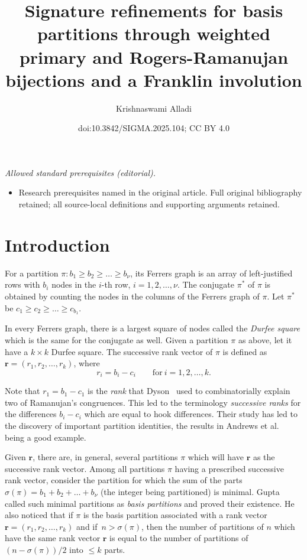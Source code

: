 \documentclass[10pt,a4paper]{amsart}
\title{Signature refinements for basis partitions through weighted primary and Rogers-Ramanujan bijections and a Franklin involution}
\author{Krishnaswami Alladi}
\date{doi:10.3842/SIGMA.2025.104; CC BY 4.0}
\numberwithin{equation}{section}
\theoremstyle{definition}
\begin{document}
\maketitle
\noindent\textit{Allowed standard prerequisites (editorial).}\begin{itemize}
\item Research prerequisites named in the original article. Full original bibliography retained; all source-local definitions and supporting arguments retained.
\end{itemize}\medskip
\section{Introduction}

For a partition $\pi\colon b_1\ge b_2\ge \dots \ge b_\nu$, its Ferrers graph
is an array of left-justified rows with $b_i$ nodes in the $i$-th row,
$i=1,2,\dots,\nu$.
The conjugate $\pi^*$ of $\pi$ is
obtained
by counting the nodes in the columns of the Ferrers graph of $\pi$.
Let
$\pi^*$ be $c_1\ge c_2 \ge \dots \ge c_{b_1}$.

In every Ferrers graph, there is a largest square of nodes called the
{\it Durfee square} which is the same for the conjugate as well. Given
a partition $\pi$ as above, let it have a $k\times k$ Durfee square.
The successive rank vector of $\pi$ is defined as $\mathbf{r}= (r_1, r_2, \dots ,
r_k)$, where
\begin{equation*}
r_i=b_i-c_i \qquad \text{for} \ i=1,2,\dots,k. %
\end{equation*}

Note that $r_1=b_1-c_1$ is the {\it rank} that Dyson~\cite{Dy44} used
to combinatorially explain two of Ramanujan's congruences. This led
to the terminology {\it successive ranks} for the differences $b_i-c_i$
which are equal to hook differences. Their study has led to the discovery of
important partition identities, the results in Andrews et al.~\cite{An-Ba-etal0087} being a good
example.

Given $\mathbf{r}$, there are, in general, several partitions $\pi$
which will have $\mathbf{r}$ as the successive rank vector. Among all
partitions $\pi$ having a prescribed successive rank vector, consider
the partition for which the sum of the parts $\sigma(\pi)=b_1+b_2+\dots +
b_{\nu}$ (the integer being partitioned) is minimal. Gupta~\cite{Gu0076} called
such minimal partitions as {\it basis partitions} and proved their
existence. He also noticed that if $\pi$ is the basis partition associated
with a rank vector $\mathbf{r}= (r_1, r_2, \dots , r_k)$ and if~${n>\sigma(\pi)}$, then the number
of partitions of $n$ which have the same rank vector $\mathbf{r}$ is equal to
the number of partitions of $(n-\sigma(\pi))/2$ into $\le k$ parts.
\end{document}

